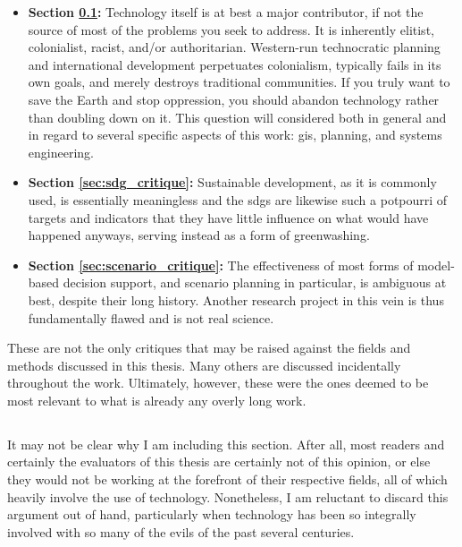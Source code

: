 \begin{itemize} \setlength{\itemsep}{0pt} \setlength{\parskip}{0pt} 
	\item{\textbf{Section \ref{sec:elitism}:} Technology itself is at best a major contributor, if not the source of most of the problems you seek to address. It is inherently elitist, colonialist, racist, and/or authoritarian. Western-run technocratic planning and international development perpetuates colonialism, typically fails in its own goals, and merely destroys traditional communities. If you truly want to save the Earth and stop oppression, you should abandon technology rather than doubling down on it. This question will considered both in general and in regard to several specific aspects of this work: \ac{gis}, planning, and systems engineering.}	
	\item{\textbf{Section \ref{sec:sdg_critique}:} Sustainable development, as it is commonly used, is essentially meaningless and the \acp{sdg} are likewise such a potpourri of targets and indicators that they have little influence on what would have happened anyways, serving instead as a form of greenwashing.}
	\item{\textbf{Section \ref{sec:scenario_critique}:} The effectiveness of most forms of model-based decision support, and scenario planning in particular, is ambiguous at best, despite their long history. Another research project in this vein is thus fundamentally flawed and is not real science.}	
\end{itemize}

These are not the only critiques that may be raised against the fields and methods discussed in this thesis. Many others are discussed incidentally throughout the work. Ultimately, however, these were the ones deemed to be most relevant to what is already any overly long work.


\subsection{} \label{sec:elitism}

It may not be clear why I am including this section. After all, most readers and certainly the evaluators of this thesis are certainly not of this opinion, or else they would not be working at the forefront of their respective fields, all of which heavily involve the use of technology. Nonetheless, I am reluctant to discard this argument out of hand, particularly when technology has been so integrally involved with so many of the evils of the past several centuries.

